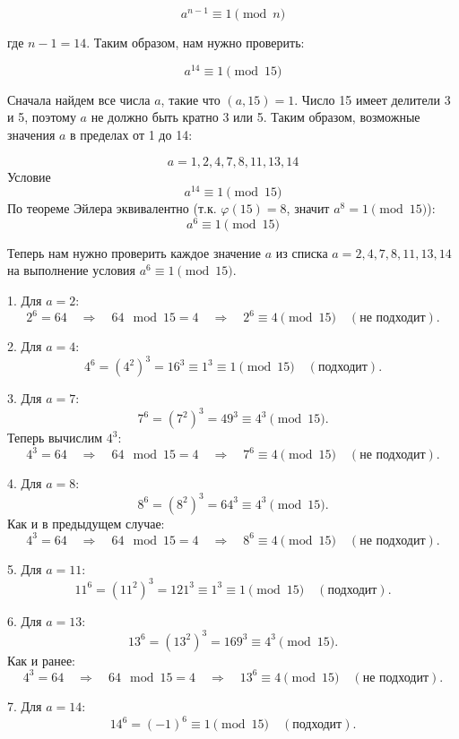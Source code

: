 \documentclass[a4paper]{article}
\renewcommand{\phi}{\varphi}
\begin{document}
\begin{enumerate}
    $$
    a^{n-1} \equiv 1 \pmod{n}
    $$
    
    где $ n - 1 = 14 $. Таким образом, нам нужно проверить:
    
    $$
    a^{14} \equiv 1 \pmod{15}
    $$
    
    Сначала найдем все числа $ a $, такие что $ (a, 15) = 1 $. Число 15 имеет делители 3 и 5, поэтому $ a $ не должно быть кратно 3 или 5. Таким образом, возможные значения $ a $ в пределах от 1 до 14:

    $$
    a = 1, 2, 4, 7, 8, 11, 13, 14
    $$
    Условие $$
    a^{14} \equiv 1 \pmod{15}
    $$
    По теореме Эйлера эквивалентно (т.к. $\phi(15) = 8$, значит $a^{8} = 1 \pmod{15}$):
    $$
    a^{6} \equiv 1 \pmod{15}
    $$

    Теперь нам нужно проверить каждое значение $ a $ из списка $ a = 2, 4, 7, 8, 11, 13, 14 $ на выполнение условия $ a^{6} \equiv 1 \pmod{15} $.
    
    1. Для $ a = 2 $:
    $$
    2^{6} = 64 \quad \Rightarrow \quad 64 \mod 15 = 4 \quad \Rightarrow \quad 2^{6} \equiv 4 \pmod{15} \quad (\text{не подходит}).
    $$

    2. Для $ a = 4 $:
    $$
    4^{6} = (4^{2})^{3} = 16^{3} \equiv 1^{3} \equiv 1 \pmod{15} \quad (\text{подходит}).
    $$

    3. Для $ a = 7 $:
    $$
    7^{6} = (7^{2})^{3} = 49^{3} \equiv 4^{3} \pmod{15}.
    $$
    Теперь вычислим $ 4^{3} $:
    $$
    4^{3} = 64 \quad \Rightarrow \quad 64 \mod 15 = 4 \quad \Rightarrow \quad 7^{6} \equiv 4 \pmod{15} \quad (\text{не подходит}).
    $$

    4. Для $ a = 8 $:
    $$
    8^{6} = (8^{2})^{3} = 64^{3} \equiv 4^{3} \pmod{15}.
    $$
    Как и в предыдущем случае:
    $$
    4^{3} = 64 \quad \Rightarrow \quad 64 \mod 15 = 4 \quad \Rightarrow \quad 8^{6} \equiv 4 \pmod{15} \quad (\text{не подходит}).
    $$

    5. Для $ a = 11 $:
    $$
    11^{6} = (11^{2})^{3} = 121^{3} \equiv 1^{3} \equiv 1 \pmod{15} \quad (\text{подходит}).
    $$

    6. Для $ a = 13 $:
    $$
    13^{6} = (13^{2})^{3} = 169^{3} \equiv 4^{3} \pmod{15}.
    $$
    Как и ранее:
    $$
    4^{3} = 64 \quad \Rightarrow \quad 64 \mod 15 = 4 \quad \Rightarrow \quad 13^{6} \equiv 4 \pmod{15} \quad (\text{не подходит}).
    $$

    7. Для $ a = 14 $:
    $$
    14^{6} = (-1)^{6} \equiv 1 \pmod{15} \quad (\text{подходит}).
    $$
    

\end{enumerate}
\end{document}
